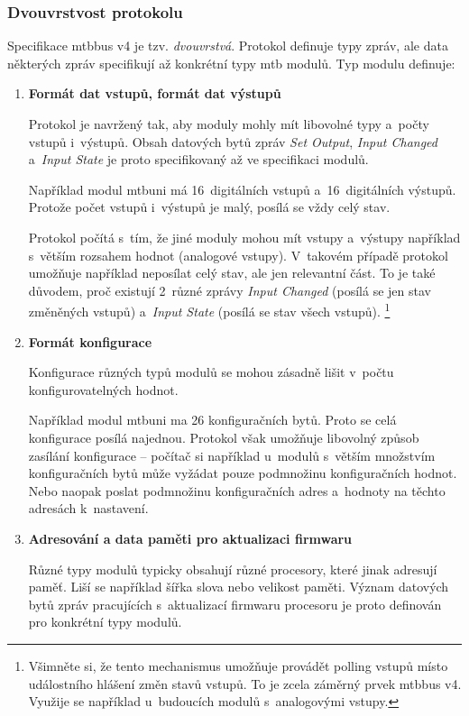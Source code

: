 \subsubsection{\textbf{Dvouvrstvost protokolu}}

Specifikace \gls{mtbbus} v4 je tzv. \textit{dvouvrstvá}. Protokol definuje
typy zpráv, ale data některých zpráv specifikují až konkrétní typy \gls{mtb}
modulů. Typ modulu definuje:

\begin{enumerate}
\item \textbf{Formát dat vstupů, formát dat výstupů}

Protokol je navržený tak, aby moduly mohly mít libovolné typy a~počty vstupů
i~výstupů. Obsah datových bytů zpráv \textit{Set Output}, \textit{Input
Changed} a~\textit{Input State} je proto specifikovaný až ve specifikaci modulů.

Například modul \gls{mtbuni} má 16~digitálních vstupů a~16~digitálních výstupů.
Protože počet vstupů i~výstupů je malý, posílá se vždy celý stav.

Protokol počítá s~tím, že jiné moduly mohou mít vstupy a~výstupy například
s~větším rozsahem hodnot (analogové vstupy). V~takovém případě protokol
umožňuje například neposílat celý stav, ale jen relevantní část. To je také
důvodem, proč existují 2~různé zprávy
\textit{Input Changed} (posílá se jen stav změněných vstupů)
a~\textit{Input State} (posílá se stav všech vstupů).
\footnote{Všimněte si, že tento mechanismus umožňuje provádět polling
vstupů místo událostního hlášení změn stavů vstupů. To je zcela záměrný prvek
\gls{mtbbus} v4. Využije se například u~budoucích modulů s~analogovými vstupy.}

\item \textbf{Formát konfigurace}

Konfigurace různých typů modulů se mohou zásadně lišit v~počtu
konfigurovatelných hodnot.

Například modul \gls{mtbuni} ma 26 konfiguračních bytů. Proto se celá
konfigurace posílá najednou. Protokol však umožňuje libovolný způsob
zasílání konfigurace – počítač si například u~modulů s~větším množstvím
konfiguračních bytů může vyžádat pouze podmnožinu konfiguračních hodnot. Nebo
naopak poslat podmnožinu konfiguračních adres a~hodnoty na těchto adresách
k~nastavení.

\item \textbf{Adresování a data paměti pro aktualizaci firmwaru}

Různé typy modulů typicky obsahují různé procesory, které jinak adresují paměť.
Liší se například šířka slova nebo velikost paměti. Význam datových bytů
zpráv pracujících s~aktualizací firmwaru procesoru je proto definován pro
konkrétní typy modulů.

\end{enumerate}

